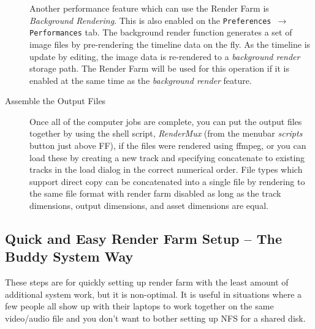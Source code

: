 \begin{description}
  Another performance feature which can use the Render Farm is
  \textit{Background Rendering}.  This is also enabled on the
  \texttt{Preferences $\rightarrow$ Performances} tab.  The background
  render function generates a set of image files by pre-rendering the
  timeline data on the fly.  As the timeline is update by editing, the
  image data is re-rendered to a \textit{background render} storage
  path.  The Render Farm will be used for this operation if it is
  enabled at the same time as the \textit{background render} feature.
\item[Assemble the Output Files] Once all of the computer jobs are
  complete, you can put the output files together by using the shell
  script, \textit{RenderMux} (from the menubar \textit{scripts} button
  just above FF), if the files were rendered using ffmpeg, or you can
  load these by creating a new track and specifying concatenate to
  existing tracks in the load dialog in the correct numerical order.
  File types which support direct copy can be concatenated into a
  single file by rendering to the same file format with render farm
  disabled as long as the track dimensions, output dimensions, and
  asset dimensions are equal.
\end{description}

\subsection{Quick and Easy Render Farm Setup – The Buddy System
  Way}%
\label{sub:buddy_system_way}

These steps are for quickly setting up render farm with the least
amount of additional system work, but it is non-optimal.  It is
useful in situations where a few people all show up with their
laptops to work together on the same video/audio file and you don’t
want to bother setting up NFS for a shared disk.

